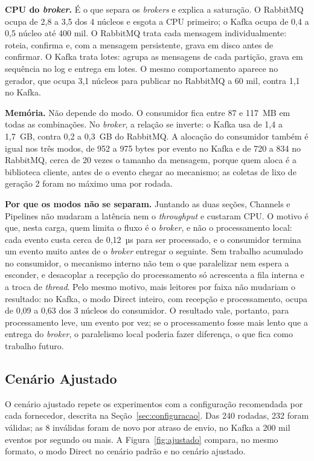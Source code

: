 \documentclass[12pt]{article}
\begin{document}
\textbf{CPU do \textit{broker}.} É o que separa os \textit{brokers} e explica a saturação. O RabbitMQ
ocupa de 2,8 a 3,5 dos 4 núcleos e esgota a CPU primeiro; o Kafka ocupa de 0,4 a 0,5
núcleo até 400 mil. O RabbitMQ trata cada mensagem individualmente: roteia, confirma e,
com a mensagem persistente, grava em disco antes de confirmar. O Kafka trata lotes: agrupa
as mensagens de cada partição, grava em sequência no log e entrega em lotes. O mesmo
comportamento aparece no gerador, que ocupa 3,1 núcleos para publicar no RabbitMQ a 60 mil,
contra 1,1 no Kafka.

\textbf{Memória.} Não depende do modo. O consumidor fica entre 87 e 117~MB em todas as
combinações. No \textit{broker}, a relação se inverte: o Kafka usa de 1,4 a 1,7~GB, contra 0,2 a
0,3~GB do RabbitMQ. A alocação do consumidor também é igual nos três modos, de 952 a 975
bytes por evento no Kafka e de 720 a 834 no RabbitMQ, cerca de 20 vezes o tamanho da
mensagem, porque quem aloca é a biblioteca cliente, antes de o evento chegar ao mecanismo;
as coletas de lixo de geração 2 foram no máximo uma por rodada.

\textbf{Por que os modos não se separam.} Juntando as duas seções, Channels e Pipelines
não mudaram a latência nem o \textit{throughput} e custaram CPU. O motivo é que, nesta carga,
quem limita o fluxo é o \textit{broker}, e não o processamento local: cada evento custa cerca
de 0,12~µs para ser processado, e o consumidor termina um evento muito antes de o
\textit{broker} entregar o seguinte. Sem trabalho acumulado no consumidor, o mecanismo interno
não tem o que paralelizar nem espera a esconder, e desacoplar a recepção do processamento
só acrescenta a fila interna e a troca de \textit{thread}. Pelo mesmo motivo, mais leitores por
faixa não mudariam o resultado: no Kafka, o modo Direct inteiro, com recepção e
processamento, ocupa de 0,09 a 0,63 dos 3 núcleos do consumidor. O resultado vale, portanto,
para processamento leve, um evento por vez; se o processamento fosse mais lento que a
entrega do \textit{broker}, o paralelismo local poderia fazer diferença, o que fica como trabalho
futuro.

\subsection{Cenário Ajustado}
\label{sec:res-ajustado}

O cenário ajustado repete os experimentos com a configuração recomendada por cada
fornecedor, descrita na Seção~\ref{sec:configuracao}. Das 240 rodadas, 232 foram válidas;
as 8 inválidas foram de novo por atraso de envio, no Kafka a 200 mil eventos por segundo
ou mais. A Figura~\ref{fig:ajustado} compara, no mesmo formato, o modo Direct no cenário
padrão e no cenário ajustado.
\end{document}
